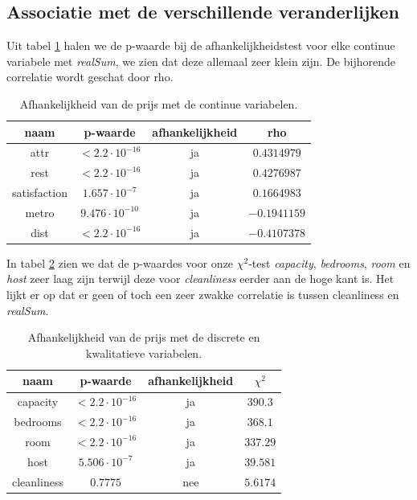 \documentclass[a4paper]{kulakarticle}
\begin{document}
	\subsection{Associatie met de verschillende veranderlijken}
	
	Uit tabel \ref{continue variabelen afhankelijkheid} halen we de p-waarde bij de afhankelijkheidstest voor elke continue variabele met \textit{realSum}, we zien dat deze allemaal zeer klein zijn. De bijhorende correlatie wordt geschat door rho.
	\begin{table}[h]
		\centering
		\begin{tabular}{c|c|c|c }
			naam & p-waarde & afhankelijkheid & rho\\
			\hline
			\hline
			attr &$ < 2.2\cdot 10^{-16}$& ja&$0.4314979 $ \\
			rest &$ < 2.2\cdot 10^{-16}$& ja&$0.4276987 $ \\
			satisfaction &$ 1.657\cdot 10^{-7}$& ja&$0.1664983 $ \\
			metro &$ 9.476\cdot 10^{-10}$& ja& $-0.1941159$ \\ 
			dist & $< 2.2 \cdot 10^{-16} $&ja& $-0.4107378$ \\
		\end{tabular}
		\caption{Afhankelijkheid van de prijs met de continue variabelen.}
		\label{continue variabelen afhankelijkheid}
	\end{table}
	In tabel \ref{discrete variabelen afhankelijkheid} zien we dat de p-waardes voor onze $\chi^2$-test \textit{capacity}, \textit{bedrooms}, \textit{room} en \textit{host} zeer laag zijn terwijl deze voor \textit{cleanliness} eerder aan de hoge kant is. Het lijkt er op dat er geen of toch een zeer zwakke correlatie is tussen cleanliness en \textit{realSum}.
	
	\begin{table}[h]
		\centering
		\begin{tabular}{c|c|c|c }
			naam & p-waarde & afhankelijkheid & $\chi ^2$\\
			\hline
			\hline
			capacity &$ < 2.2\cdot 10^{-16}$& ja& $390.3$ \\ 
			bedrooms &$ < 2.2\cdot 10^{-16}$& ja&$368.1 $ \\
			room &$ < 2.2\cdot 10^{-16}$& ja&$ 337.29$ \\
			host &$ 5.506\cdot 10^{-7}$& ja&$39.581 $ \\
			cleanliness & $0.7775$&nee& $5.6174$ \\
		\end{tabular}
		\caption{Afhankelijkheid van de prijs met de discrete en kwalitatieve variabelen.}
		\label{discrete variabelen afhankelijkheid}
	\end{table}
	
\end{document}
